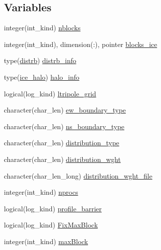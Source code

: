 \subsection*{Variables}
\begin{DoxyCompactItemize}
\item 
integer(int\_\-kind) \hyperlink{namespaceice__domain_aae3d2de717ee7a743c9635b3a9e35a95}{nblocks}
\item 
integer(int\_\-kind), dimension(:), pointer \hyperlink{namespaceice__domain_a152cf5087ce1dccce8f5e147306320ae}{blocks\_\-ice}
\item 
type(\hyperlink{typeice__distribution_1_1distrb}{distrb}) \hyperlink{namespaceice__domain_af84e6e4ee8c3c2d04326e26048f003b1}{distrb\_\-info}
\item 
type(\hyperlink{typeice__boundary_1_1ice__halo}{ice\_\-halo}) \hyperlink{namespaceice__domain_a06df1ee3a618bfdd4e7f6445a5376604}{halo\_\-info}
\item 
logical(log\_\-kind) \hyperlink{namespaceice__domain_aec6b06cf3394cb064898a46434391258}{ltripole\_\-grid}
\item 
character(char\_\-len) \hyperlink{namespaceice__domain_a56566cef9f35bb56cb7a97e73ce17acc}{ew\_\-boundary\_\-type}
\item 
character(char\_\-len) \hyperlink{namespaceice__domain_a50e350eed39ec93fdfef517e4b45b5a5}{ns\_\-boundary\_\-type}
\item 
character(char\_\-len) \hyperlink{namespaceice__domain_a9c80809a4e6a48707a7ef1f2eb795ea5}{distribution\_\-type}
\item 
character(char\_\-len) \hyperlink{namespaceice__domain_a89743a68c52b19112e09ab35a820ff26}{distribution\_\-wght}
\item 
character(char\_\-len\_\-long) \hyperlink{namespaceice__domain_a010eb9c42e0d853d313f922f3ddecf93}{distribution\_\-wght\_\-file}
\item 
integer(int\_\-kind) \hyperlink{namespaceice__domain_afcc67a62427b0b7620d366168d6a42ff}{nprocs}
\item 
logical(log\_\-kind) \hyperlink{namespaceice__domain_a8f4a0f7b5e1a37ba6e8e8e64dd040267}{profile\_\-barrier}
\item 
logical(log\_\-kind) \hyperlink{namespaceice__domain_a2d52e3f832101d05076304dedcbfd465}{FixMaxBlock}
\item 
integer(int\_\-kind) \hyperlink{namespaceice__domain_ae245e03a7c30b2d04cbd99256514fe65}{maxBlock}
\end{DoxyCompactItemize}


